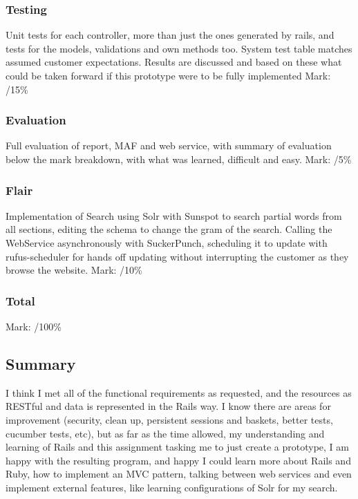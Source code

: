 \documentclass[12pt]{article}
\begin{document}
\subsubsection{Testing}
Unit tests for each controller, more than just the ones generated by rails, and tests for the models, validations and own methods too. System test table matches assumed customer expectations. Results are discussed and based on these what could be taken forward if this prototype were to be fully implemented
Mark: /15\%

\subsubsection{Evaluation}
Full evaluation of report, MAF and web service, with summary of evaluation below the mark breakdown, with what was learned, difficult and easy.
Mark: /5\%

\subsubsection{Flair}
Implementation of Search using Solr with Sunspot to search partial words from all sections, editing the schema to change the gram of the search. Calling the WebService asynchronously with SuckerPunch, scheduling it to update with rufus-scheduler for hands off updating without interrupting the customer as they browse the website.
Mark: /10\%

\subsubsection{Total}
Mark: /100\%

\subsection{Summary}
I think I met all of the functional requirements as requested, and the resources as RESTful and data is represented in the Rails way. I know there are areas for improvement (security, clean up, persistent sessions and baskets, better tests, cucumber tests, etc), but as far as the time allowed, my understanding and learning of Rails and this assignment tasking me to just create a prototype, I am happy with the resulting program, and happy I could learn more about Rails and Ruby, how to implement an MVC pattern, talking between web services and even implement external features, like learning configurations of Solr for my search.
\end{document}
